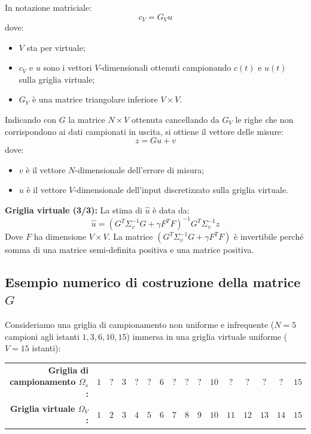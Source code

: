 In notazione matriciale:
\[
    c_V = G_V u
\]
dove:
\begin{itemize}
    \item $V$ sta per virtuale;
    \item $c_V$ e $u$ sono i vettori $V$-dimensionali ottenuti campionando $c(t)$ e $u(t)$ sulla griglia virtuale;
    \item $G_V$ è una matrice triangolare inferiore $V \times V$.
\end{itemize}

Indicando con $G$ la matrice $N \times V$ ottenuta cancellando da $G_V$ le righe che non corrispondono ai dati campionati in uscita, si ottiene il vettore delle misure:
\[
    z = G u + v
\]
dove:
\begin{itemize}
    \item $v$ è il vettore $N$-dimensionale dell'errore di misura;
    \item $u$ è il vettore $V$-dimensionale dell'input discretizzato sulla griglia virtuale.
\end{itemize}

\noindent\textbf{Griglia virtuale (3/3):} La stima di $\hat{u}$ è data da:
\[
    \hat{u} = (G^T \Sigma_v^{-1} G + \gamma F^T F)^{-1} G^T \Sigma_v^{-1} z
\]
Dove $F$ ha dimensione $V \times V$. La matrice $(G^T \Sigma_v^{-1} G + \gamma F^T F)$ è invertibile perché somma di una matrice semi-definita positiva e una matrice positiva.

\subsection{Esempio numerico di costruzione della matrice $G$}

Consideriamo una griglia di campionamento non uniforme e infrequente ($N = 5$ campioni agli istanti $1, 3, 6, 10, 15$) immersa in una griglia virtuale uniforme ($V = 15$ istanti):
\begin{center}
\begin{tabular}{rccccccccccccccc}
    \textbf{Griglia di campionamento $\Omega_s$:} & $1$ & $?$ & $3$ & $?$ & $?$ & $6$ & $?$ & $?$ & $?$ & $10$ & $?$ & $?$ & $?$ & $?$ & $15$ \\
    \textbf{Griglia virtuale $\Omega_V$:} & $1$ & $2$ & $3$ & $4$ & $5$ & $6$ & $7$ & $8$ & $9$ & $10$ & $11$ & $12$ & $13$ & $14$ & $15$
\end{tabular}
\end{center}

